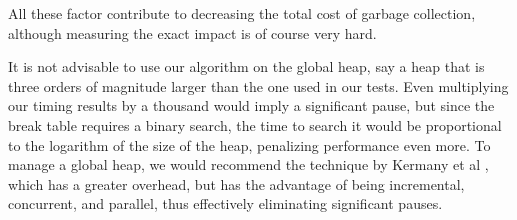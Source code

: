 All these factor contribute to decreasing the total cost of garbage
collection, although measuring the exact impact is of course very
hard. 

It is not advisable to use our algorithm on the global heap, say a
heap that is three orders of magnitude larger than the one used in
our tests.  Even multiplying our timing results by a thousand would
imply a significant pause, but since the break table requires a
binary search, the time to search it would be proportional to the
logarithm of the size of the heap, penalizing performance even more.
To manage a global heap, we would recommend the technique by 
Kermany et al \cite{Kermany:2006:CCI:1133981.1134023}, which has a
greater overhead, but has the advantage of being incremental,
concurrent, and parallel, thus effectively eliminating significant
pauses. 
